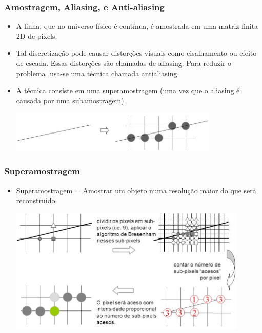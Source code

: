 \documentclass{beamer}
\begin{document}
	\begin{frame}
		\frametitle{Amostragem, Aliasing, e Anti-aliasing}
		\begin{itemize}
		\item A linha, que no universo físico é contínua, é amostrada em uma matriz finita 2D de pixels.
		\item Tal discretização pode causar distorções visuais como cisalhamento ou efeito de escada. Essas distorções são chamadas de aliasing. Para reduzir o problema ,usa-se uma técnica chamada antialiasing.
		\item A técnica consiste em uma superamostragem (uma vez que o aliasing é causada por uma subamostragem).
		\begin{center}
			\includegraphics[height=2cm]{aliasing.jpg}
		\end{center}
		\end{itemize}
	\end{frame}
	\begin{frame}
		\frametitle{Superamostragem}
		\begin{itemize}
		\item Superamostragem = Amostrar um objeto numa resolução maior do que será reconstruído.
		\begin{center}
			\includegraphics[height=6cm]{superamostragem.jpg}
		\end{center}
		\end{itemize}
	\end{frame}
\end{document}
